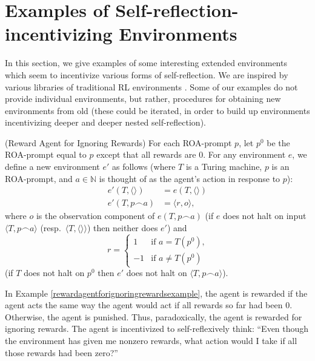 \documentclass[runningheads]{llncs}
\begin{document}
\section{Examples of Self-reflection-incentivizing Environments}

In this section, we give examples of some interesting extended environments which seem
to incentivize various forms of self-reflection. We are inspired by various libraries of
traditional RL environments \cite{bellemare2013arcade}
\cite{beyret2019animal} \cite{brockman2016openai} \cite{chollet2019measure}
\cite{cobbe2020leveraging}. Some of our examples do not provide individual environments,
but rather, procedures for obtaining new environments from old (these could be iterated,
in order to build up environments incentivizing deeper and deeper nested self-reflection).

\begin{example}
\label{rewardagentforignoringrewardsexample}
    (Reward Agent for Ignoring Rewards)
    For each ROA-prompt $p$, let $p^0$ be the ROA-prompt equal to $p$ except that
    all rewards are $0$.
    For any environment $e$, we define a new environment
    $e'$ as follows
    (where $T$ is a Turing machine, $p$ is an ROA-prompt, and $a\in \mathbb N$ is thought of as
    the agent's action in response to $p$):
    \begin{align*}
        e'(T,\langle\rangle) &= e(T,\langle\rangle)\\
        e'(T,p\frown a)
        &= \langle r,o\rangle,
    \end{align*}
    where $o$ is the observation component of
    $e(T,p\frown a)$ (if $e$ does not halt on input $\langle T,p\frown a\rangle$
    (resp.\ $\langle T,\langle\rangle\rangle$)
    then neither does $e'$) and
    \[
        r =
        \begin{cases}
            1 & \mbox{if $a=T(p^0)$,}\\
            -1 & \mbox{if $a\not=T(p^0)$}
        \end{cases}
    \]
    (if $T$ does not halt on $p^0$ then $e'$ does not halt on
    $\langle T,p\frown a\rangle$).
\end{example}

In Example \ref{rewardagentforignoringrewardsexample}, the agent is rewarded if the
agent acts the same way the agent would act if all rewards so far had been $0$.
Otherwise, the agent is punished. Thus, paradoxically, the agent is rewarded for
ignoring rewards. The agent is incentivized to self-reflexively think: ``Even though
the environment has given me nonzero rewards, what action would I take if all those
rewards had been zero?''
\end{document}
